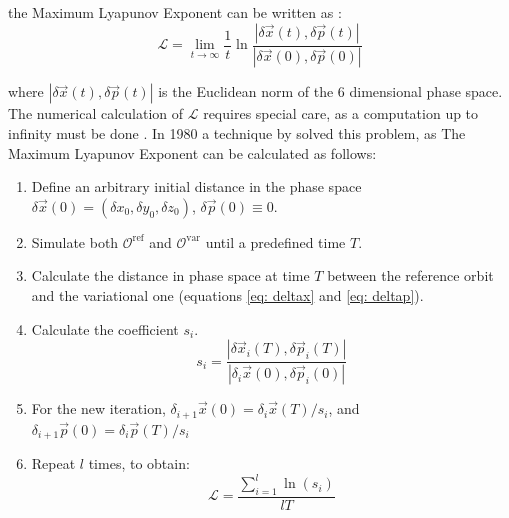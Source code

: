 	the Maximum Lyapunov Exponent can be written as \cite{morbidelli2002modern, munoz2015chaotic}:
	\begin{equation}
		\mathcal{L} = \lim_{t\rightarrow\infty}\dfrac{1}{t}\ln\dfrac{\left|\delta\vec{x}(t), \delta\vec{p}(t)\right|}{\left|\delta\vec{x}(0), \delta\vec{p}(0)\right|}
	\end{equation}
	
	where $|\delta\vec{x}(t), \delta\vec{p}(t)|$ is the Euclidean norm of the 6 dimensional phase space. The numerical calculation of $\mathcal{L}$ requires special care, as a computation up to infinity must be done \cite{morbidelli2002modern}. In 1980 a technique by \citeauthor{benettin1980lyapunov} solved this problem, as The Maximum Lyapunov Exponent can be calculated as follows:
	\begin{enumerate}
		\item Define an arbitrary initial distance in the phase space $\delta\vec{x}(0) = (\delta x_0, \delta y_0, \delta z_0)$, $\delta\vec{p}(0) \equiv 0$.
		\item Simulate both $\mathcal{O}^\text{ref}$ and $\mathcal{O}^\text{var}$ until a predefined time $T$.
		\item Calculate the distance in phase space at time $T$ between the reference orbit and the variational one (equations \ref{eq: deltax} and \ref{eq: deltap}).
		\item Calculate the coefficient $s_i$.
		\begin{equation}
			s_i = \dfrac{\left|\delta\vec{x}_i(T), \delta\vec{p}_i(T)\right|}{\left|\delta_i\vec{x}(0), \delta\vec{p}_i(0)\right|}
		\end{equation}
		\item For the new iteration, $\delta_{i + 1}\vec{x}(0) = \delta_i\vec{x}(T) / s_i$, and $\delta_{i + 1}\vec{p}(0) = \delta_i\vec{p}(T) / s_i$
		\item Repeat $l$ times, to obtain:
		\begin{equation}
			\mathcal{L} = \dfrac{\sum_{i = 1}^l \ln(s_i)}{lT}
		\end{equation}
	\end{enumerate} 

%

